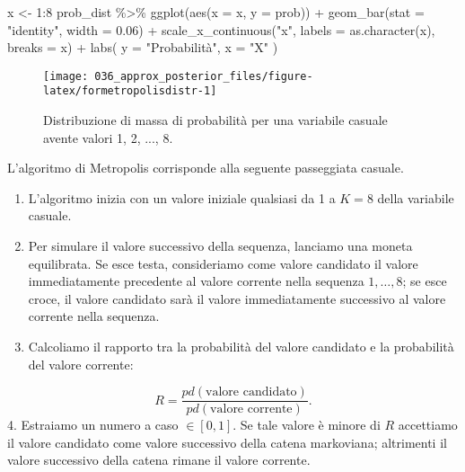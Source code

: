 \documentclass[
]{memoir}
\newenvironment{Shaded}{\begin{snugshade}}{\end{snugshade}}
\newcommand{\AttributeTok}[1]{\textcolor[rgb]{0.77,0.63,0.00}{#1}}
\newcommand{\DecValTok}[1]{\textcolor[rgb]{0.00,0.00,0.81}{#1}}
\newcommand{\FloatTok}[1]{\textcolor[rgb]{0.00,0.00,0.81}{#1}}
\newcommand{\FunctionTok}[1]{\textcolor[rgb]{0.00,0.00,0.00}{#1}}
\newcommand{\NormalTok}[1]{#1}
\newcommand{\OtherTok}[1]{\textcolor[rgb]{0.56,0.35,0.01}{#1}}
\newcommand{\SpecialCharTok}[1]{\textcolor[rgb]{0.00,0.00,0.00}{#1}}
\newcommand{\StringTok}[1]{\textcolor[rgb]{0.31,0.60,0.02}{#1}}
\begin{document}
\begin{Shaded}
\begin{Highlighting}[]
\NormalTok{x }\OtherTok{\textless{}{-}} \DecValTok{1}\SpecialCharTok{:}\DecValTok{8}
\NormalTok{prob\_dist }\SpecialCharTok{\%\textgreater{}\%}
  \FunctionTok{ggplot}\NormalTok{(}\FunctionTok{aes}\NormalTok{(}\AttributeTok{x =}\NormalTok{ x, }\AttributeTok{y =}\NormalTok{ prob)) }\SpecialCharTok{+}
  \FunctionTok{geom\_bar}\NormalTok{(}\AttributeTok{stat =} \StringTok{"identity"}\NormalTok{, }\AttributeTok{width =} \FloatTok{0.06}\NormalTok{) }\SpecialCharTok{+}
  \FunctionTok{scale\_x\_continuous}\NormalTok{(}\StringTok{"x"}\NormalTok{, }\AttributeTok{labels =} \FunctionTok{as.character}\NormalTok{(x), }\AttributeTok{breaks =}\NormalTok{ x) }\SpecialCharTok{+}
  \FunctionTok{labs}\NormalTok{(}
    \AttributeTok{y =} \StringTok{"Probabilità"}\NormalTok{,}
    \AttributeTok{x =} \StringTok{"X"}
\NormalTok{  )}
\end{Highlighting}
\end{Shaded}

\begin{figure}

{\centering \texttt{[image: 036\_approx\_posterior\_files/figure-latex/formetropolisdistr-1]} 

}

\caption{Distribuzione di massa di probabilità per una variabile casuale avente valori 1, 2, ..., 8.}\label{fig:formetropolisdistr}
\end{figure}

\noindent
L'algoritmo di Metropolis corrisponde alla seguente passeggiata casuale.

\begin{enumerate}
\def\labelenumi{\arabic{enumi}.}
\item
  L'algoritmo inizia con un valore iniziale qualsiasi da 1 a \(K=8\) della variabile casuale.
\item
  Per simulare il valore successivo della sequenza, lanciamo una moneta equilibrata. Se esce testa, consideriamo come valore candidato il valore immediatamente precedente al valore corrente nella sequenza \(1, \dots, 8\); se esce croce, il valore candidato sarà il valore immediatamente successivo al valore corrente nella sequenza.
\item
  Calcoliamo il rapporto tra la probabilità del valore candidato e la probabilità del valore corrente:
\end{enumerate}

\[
R = \frac{pd(\text{valore candidato})}{pd(\text{valore corrente})}.
\]
4. Estraiamo un numero a caso \(\in [0, 1]\). Se tale valore è minore di \(R\) accettiamo il valore candidato come valore successivo della catena markoviana; altrimenti il valore successivo della catena rimane il valore corrente.
\end{document}
